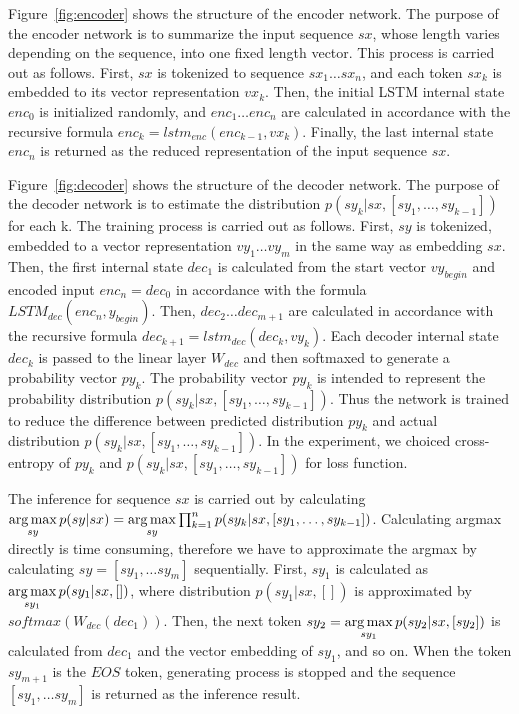 \documentclass[senior,final,11pt]{iscs-thesis}
\newcommand{\argmax}{\mathop{\rm arg\,max}\limits}
\begin{document}
Figure~\ref{fig:encoder} shows the structure of the encoder network.  The purpose of the encoder network is to summarize the input sequence $sx$, whose length varies depending on the sequence, into one fixed length vector.
This process is carried out as follows. 
First, $sx$ is tokenized to sequence $sx_{1} \dots sx_{n}$, and each token $sx_{k}$ is embedded to its vector representation $vx_{k}$. 
Then, the initial LSTM internal state $enc_0$ is initialized randomly, 
and $ enc_{1} \dots enc_{n} $ are calculated in accordance with the recursive formula $ enc_{k} = lstm_{enc}(enc_{k-1},vx_{k}) $.
Finally, the last internal state $ enc_{n}$ is returned as the reduced representation of the input sequence $sx$.

Figure~\ref{fig:decoder} shows the structure of the decoder network.  The purpose of the decoder network is to estimate the distribution $ p(sy_k|sx,[sy_1,\dots,sy_{k-1}]) $ for each k. 
The training process is carried out as follows. 
First, $sy$ is tokenized, embedded to a vector representation $vy_{1} \dots vy_{m}$ in the same way as embedding $sx$.
Then, the first internal state $ dec_{1}$ is calculated from the start vector $vy_{begin}$ and encoded input $ enc_{n} = dec_{0} $ in accordance with the formula  $ LSTM_{dec}(enc_{n},y_{begin}) $.
Then, $ dec_{2} \dots dec_{m+1} $ are calculated in accordance with the recursive formula $ dec_{k+1} = lstm_{dec}(dec_{k},vy_{k}) $.
Each decoder internal state $ dec_{k} $ is passed to the linear layer $ W_{dec} $ and then softmaxed to generate a probability vector $ py_{k} $.
The probability vector $ py_{k} $ is intended to represent the probability distribution $ p(sy_k|sx,[sy_1,\dots,sy_{k-1}]) $.
Thus the network is trained to reduce the difference between predicted distribution $ py_{k} $ and actual distribution $ p(sy_k|sx,[sy_1,\dots,sy_{k-1}]) $.
In the experiment, we choiced cross-entropy of $ py_{k} $ and $ p(sy_k|sx,[sy_1,\dots,sy_{k-1}]) $ for loss function.

The inference for sequence $sx$ is carried out by calculating 
$ \argmax_{sy} p(sy|sx) = \argmax_{sy} \prod_{k=1}^n p(sy_k|sx,[sy_1,\dots,sy_{k-1}]) $.
Calculating argmax directly is time consuming, therefore we have to approximate the argmax by calculating $sy = [sy_1, \dots sy_m]$ sequentially.
First, $sy_1$ is calculated as $ \argmax_{sy_1} p(sy_1|sx,[]) $, where distribution $ p(sy_1|sx,[]) $ is approximated by 
$ softmax(W_{dec}(dec_{1}))$. 
Then, the next token $sy_2 = \argmax_{sy_1} p(sy_2|sx,[sy_2]) $ is calculated from $ dec_{1} $ and the vector embedding of $sy_1$, and so on.
When the token $sy_{m+1}$ is the $ EOS $ token, generating process is stopped and the sequence $ [sy_1, \dots sy_m]$ is returned as the inference result.
\end{document}
